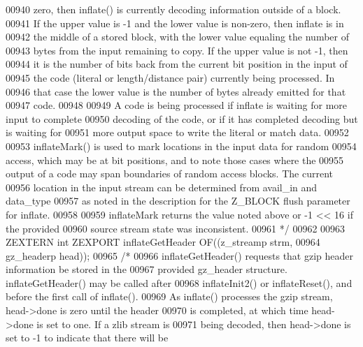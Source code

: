 \begin{DoxyCode}
00940 \textcolor{comment}{   zero, then inflate() is currently decoding information outside of a block.}
00941 \textcolor{comment}{   If the upper value is -1 and the lower value is non-zero, then inflate is in}
00942 \textcolor{comment}{   the middle of a stored block, with the lower value equaling the number of}
00943 \textcolor{comment}{   bytes from the input remaining to copy.  If the upper value is not -1, then}
00944 \textcolor{comment}{   it is the number of bits back from the current bit position in the input of}
00945 \textcolor{comment}{   the code (literal or length/distance pair) currently being processed.  In}
00946 \textcolor{comment}{   that case the lower value is the number of bytes already emitted for that}
00947 \textcolor{comment}{   code.}
00948 \textcolor{comment}{}
00949 \textcolor{comment}{     A code is being processed if inflate is waiting for more input to complete}
00950 \textcolor{comment}{   decoding of the code, or if it has completed decoding but is waiting for}
00951 \textcolor{comment}{   more output space to write the literal or match data.}
00952 \textcolor{comment}{}
00953 \textcolor{comment}{     inflateMark() is used to mark locations in the input data for random}
00954 \textcolor{comment}{   access, which may be at bit positions, and to note those cases where the}
00955 \textcolor{comment}{   output of a code may span boundaries of random access blocks.  The current}
00956 \textcolor{comment}{   location in the input stream can be determined from avail\_in and data\_type}
00957 \textcolor{comment}{   as noted in the description for the Z\_BLOCK flush parameter for inflate.}
00958 \textcolor{comment}{}
00959 \textcolor{comment}{     inflateMark returns the value noted above or -1 << 16 if the provided}
00960 \textcolor{comment}{   source stream state was inconsistent.}
00961 \textcolor{comment}{*/}
00962 
00963 ZEXTERN \textcolor{keywordtype}{int} ZEXPORT inflateGetHeader OF((z\_streamp strm,
00964                                          gz\_headerp head));
00965 \textcolor{comment}{/*}
00966 \textcolor{comment}{     inflateGetHeader() requests that gzip header information be stored in the}
00967 \textcolor{comment}{   provided gz\_header structure.  inflateGetHeader() may be called after}
00968 \textcolor{comment}{   inflateInit2() or inflateReset(), and before the first call of inflate().}
00969 \textcolor{comment}{   As inflate() processes the gzip stream, head->done is zero until the header}
00970 \textcolor{comment}{   is completed, at which time head->done is set to one.  If a zlib stream is}
00971 \textcolor{comment}{   being decoded, then head->done is set to -1 to indicate that there will be}

\end{DoxyCode}
